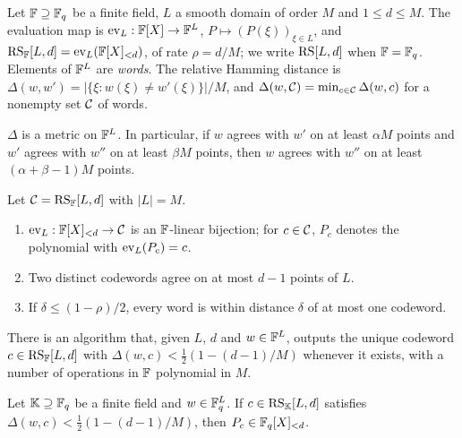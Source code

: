 \begin{definition}\label{def:rs}
Let $\mathbb{F} \supseteq \mathbb{F}_q$ be a finite field, $L$ a smooth domain of order $M$ and $1 \le d \le M$.
The evaluation map is $\mathrm{ev}_L : \mathbb{F}[X] \to \mathbb{F}^L$, $P \mapsto (P(\xi))_{\xi \in L}$, and $\mathrm{RS}_{\mathbb{F}}[L,d] = \mathrm{ev}_L(\mathbb{F}[X]_{<d})$, of rate $\rho = d/M$; we write $\mathrm{RS}[L,d]$ when $\mathbb{F} = \mathbb{F}_q$.
Elements of $\mathbb{F}^L$ are \emph{words}.
The relative Hamming distance is $\Delta(w,w') = |\{\xi : w(\xi) \ne w'(\xi)\}|/M$, and $\Delta(w,\mathcal{C}) = \min_{c \in \mathcal{C}}\Delta(w,c)$ for a nonempty set $\mathcal{C}$ of words.
\end{definition}

\begin{lemma}\label{lem:metric}
$\Delta$ is a metric on $\mathbb{F}^L$. In particular, if $w$ agrees with $w'$ on at least $\alpha M$ points and $w'$ agrees with $w''$ on at least $\beta M$ points, then $w$ agrees with $w''$ on at least $(\alpha + \beta - 1)M$ points.
\end{lemma}

\begin{lemma}\label{lem:rs-params}
Let $\mathcal{C} = \mathrm{RS}_{\mathbb{F}}[L,d]$ with $|L| = M$.
\begin{enumerate}
  \item $\mathrm{ev}_L : \mathbb{F}[X]_{<d} \to \mathcal{C}$ is an $\mathbb{F}$-linear bijection; for $c \in \mathcal{C}$, $P_c$ denotes the polynomial with $\mathrm{ev}_L(P_c) = c$.
  \item Two distinct codewords agree on at most $d-1$ points of $L$.
  \item If $\delta \le (1-\rho)/2$, every word is within distance $\delta$ of at most one codeword.
\end{enumerate}
\end{lemma}

\begin{fact}\label{fact:decode}
There is an algorithm that, given $L$, $d$ and $w \in \mathbb{F}^L$, outputs the unique codeword $c \in \mathrm{RS}_{\mathbb{F}}[L,d]$ with $\Delta(w,c) < \frac12(1-(d-1)/M)$ whenever it exists, with a number of operations in $\mathbb{F}$ polynomial in $M$.
\end{fact}

\begin{lemma}\label{lem:descent}
Let $\mathbb{K} \supseteq \mathbb{F}_q$ be a finite field and $w \in \mathbb{F}_q^L$.
If $c \in \mathrm{RS}_{\mathbb{K}}[L,d]$ satisfies $\Delta(w,c) < \frac12(1-(d-1)/M)$, then $P_c \in \mathbb{F}_q[X]_{<d}$.
\end{lemma}

